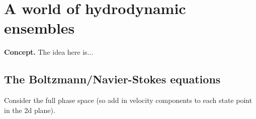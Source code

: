\chapter{\sffamily A world of hydrodynamic ensembles}

{\bfseries\sffamily Concept.} The idea here is... 


\section{\sffamily The Boltzmann/Navier-Stokes equations}

Consider the full phase space (so add in velocity components to each state point in the 2d plane).